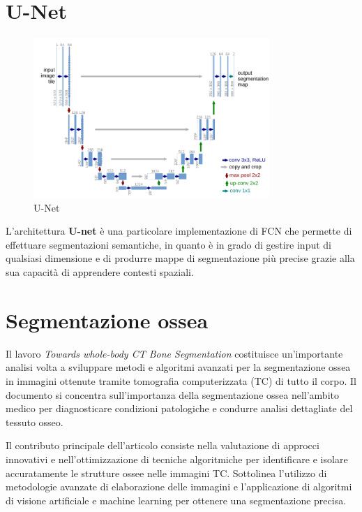 \section{U-Net} \label{sec:unet} 

\begin{figure}[H]
  \begin{center}
    \includegraphics[width=0.8\textwidth]{Immagini/unet.png}
  \end{center}
  \caption{U-Net}\label{fig:unet}
\end{figure}


L'architettura \textbf{U-net} \cite{ronneberger2015unet} è una particolare
implementazione di FCN che permette di effettuare segmentazioni semantiche,
in quanto è in grado di gestire input di qualsiasi dimensione e di produrre
mappe di segmentazione pi\`u precise grazie alla sua capacit\`a di apprendere
contesti spaziali.



\section{Segmentazione ossea} \label{sec:segmentazione_ossea}

Il lavoro \textit{Towards whole-body CT Bone Segmentation}
\cite{10.1007/978-3-662-56537-7_59} costituisce un'importante analisi volta a
sviluppare metodi e algoritmi avanzati per la segmentazione ossea in immagini
ottenute tramite tomografia computerizzata (TC) di tutto il corpo. Il documento
si concentra sull'importanza della segmentazione ossea nell'ambito medico per
diagnosticare condizioni patologiche e condurre analisi dettagliate del tessuto
osseo.

Il contributo principale dell'articolo consiste nella valutazione di approcci
innovativi e nell'ottimizzazione di tecniche algoritmiche per identificare e
isolare accuratamente le strutture ossee nelle immagini TC. Sottolinea
l'utilizzo di metodologie avanzate di elaborazione delle immagini e
l'applicazione di algoritmi di visione artificiale e machine learning per
ottenere una segmentazione precisa.

